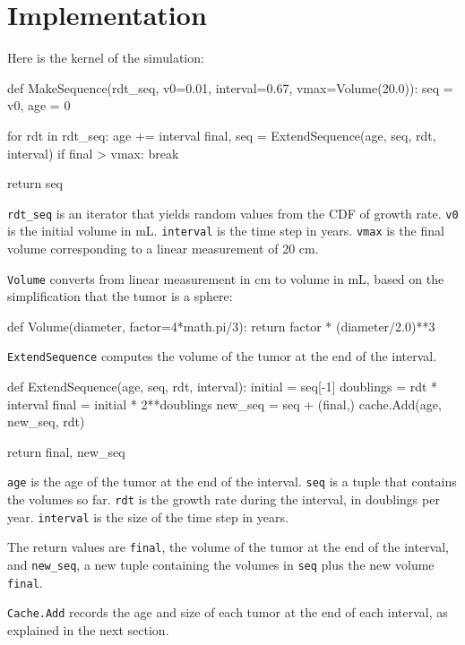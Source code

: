\documentclass[12pt]{book}
\theoremstyle{exercise}
\begin{document}
\section{Implementation}

Here is the kernel of the simulation:

\begin{code}
def MakeSequence(rdt_seq, v0=0.01, interval=0.67, vmax=Volume(20.0)):
    seq = v0,
    age = 0

    for rdt in rdt_seq:
        age += interval
        final, seq = ExtendSequence(age, seq, rdt, interval)
        if final > vmax:
            break

    return seq
\end{code}

\verb"rdt_seq" is an iterator that yields 
random values from the CDF of growth rate.
{\tt v0} is the initial volume in mL.  {\tt interval} is the time step
in years.  {\tt vmax} is the final volume corresponding to a linear
measurement of 20 cm.

{\tt Volume} converts from linear measurement in cm to volume
in mL, based on the simplification that the tumor is a sphere:

\begin{code}
def Volume(diameter, factor=4*math.pi/3):
    return factor * (diameter/2.0)**3
\end{code}

{\tt ExtendSequence} computes the volume of the tumor at the
end of the interval.

\begin{code}
def ExtendSequence(age, seq, rdt, interval):
    initial = seq[-1]
    doublings = rdt * interval
    final = initial * 2**doublings
    new_seq = seq + (final,)
    cache.Add(age, new_seq, rdt)
    
    return final, new_seq
\end{code}

{\tt age} is the age of the tumor at the end of the interval.
{\tt seq} is a tuple that contains the volumes so far.  {\tt rdt} is
the growth rate during the interval, in doublings per year.
{\tt interval} is the size of the time step in years.

The return values are {\tt final}, the volume of the
tumor at the end of the interval, and \verb"new_seq", a new
tuple containing the volumes in {\tt seq} plus the new volume
{\tt final}.

{\tt Cache.Add} records the age and size of each tumor at the end
of each interval, as explained in the next section.
\end{document}
